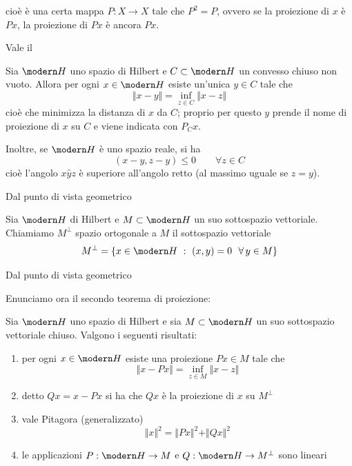 cioè è una certa mappa $P:X\to X$ tale che $P^2=P$, ovvero se la proiezione di $x$ è $Px$, la proiezione di $Px$ è ancora $Px$.

Vale il

\begin{thm}
Sia $\Hc$ uno spazio di Hilbert e $C\subset \Hc$ un convesso chiuso non vuoto. Allora per ogni $x\in \Hc$ esiste un'unica $y\in C$ tale che
\begin{equation*}
\Vert x - y \Vert =\inf_{z\in C} \Vert x-z \Vert
\end{equation*}
cioè che minimizza la distanza di $x$ da $C$; proprio per questo $y$ prende il nome di proiezione di $x$ su $C$ e viene indicata con $P_Cx$. 

Inoltre, se $\Hc$ è uno spazio reale, si ha
\begin{equation*}
(x-y,z-y)\leq 0\qquad \forall z \in C
\end{equation*}
cioè l'angolo $x\widehat{y}z$ è superiore all'angolo retto (al massimo uguale se $z=y$).
\end{thm}

Dal punto di vista geometrico


\begin{defn}
Sia $\Hc$ di Hilbert e $M\subset \Hc$ un suo sottospazio vettoriale. Chiamiamo $M^{\perp}$ spazio ortogonale a $M$ il sottospazio vettoriale
\begin{equation*}
M^{\perp} = \{x\in \Hc\ :\ (x, y) = 0\ \ \forall y\in M\}
\end{equation*}
\end{defn}

Dal punto di vista geometrico


Enunciamo ora il secondo teorema di proiezione:

\begin{thm}
Sia $\Hc$ uno spazio di Hilbert e sia $M\subset \Hc$ un suo sottospazio vettoriale chiuso. Valgono i seguenti risultati:

\renewcommand{\theenumi}{\roman{enumi}}
\begin{enumerate}
    \item per ogni $ x\in \Hc$ esiste una proiezione $Px\in M$ tale che 
    $$
    \Vert x - Px \Vert =\inf_{z\in M} \Vert x-z \Vert
    $$
    \item detto $Qx=x-Px$ si ha che $Qx$ è la proiezione di $x$ su $M^{\perp}$ 
    \item vale Pitagora (generalizzato)
    $$
    \Vert x \Vert^{2} = \Vert Px \Vert^{2} + \Vert Qx \Vert^{2}
    $$
    \item le applicazioni $P: \Hc\rightarrow M$ e $Q: \Hc\rightarrow M^{\perp}$ sono lineari
\end{enumerate}
\end{thm}

